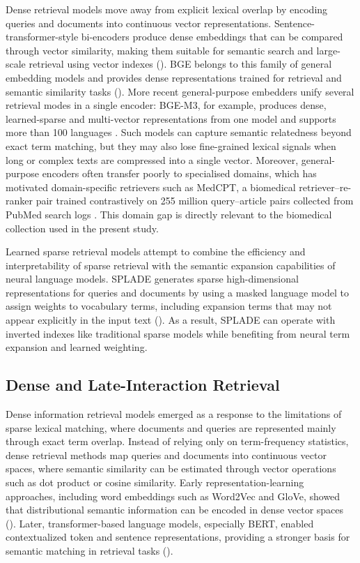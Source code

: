 \documentclass[preprint,5p,times,twocolumn,authoryear]{elsarticle}
\begin{document}
Dense retrieval models move away from explicit lexical overlap by encoding queries and documents into continuous vector representations. Sentence-transformer-style bi-encoders produce dense embeddings that can be compared through vector similarity, making them suitable for semantic search and large-scale retrieval using vector indexes (\cite{reimers2019sentencebert}). BGE belongs to this family of general embedding models and provides dense representations trained for retrieval and semantic similarity tasks (\cite{xiao2024cpack}). More recent general-purpose embedders unify several retrieval modes in a single encoder: BGE-M3, for example, produces dense, learned-sparse and multi-vector representations from one model and supports more than 100 languages \citep{chen2024m3}. Such models can capture semantic relatedness beyond exact term matching, but they may also lose fine-grained lexical signals when long or complex texts are compressed into a single vector. Moreover, general-purpose encoders often transfer poorly to specialised domains, which has motivated domain-specific retrievers such as MedCPT, a biomedical retriever--re-ranker pair trained contrastively on 255 million query--article pairs collected from PubMed search logs \citep{jin2023medcpt}. This domain gap is directly relevant to the biomedical collection used in the present study.

Learned sparse retrieval models attempt to combine the efficiency and interpretability of sparse retrieval with the semantic expansion capabilities of neural language models. SPLADE generates sparse high-dimensional representations for queries and documents by using a masked language model to assign weights to vocabulary terms, including expansion terms that may not appear explicitly in the input text (\cite{formal2021splade}). As a result, SPLADE can operate with inverted indexes like traditional sparse models while benefiting from neural term expansion and learned weighting.

\subsection{Dense and Late-Interaction Retrieval}
Dense information retrieval models emerged as a response to the limitations of sparse lexical matching, where documents and queries are represented mainly through exact term overlap. Instead of relying only on term-frequency statistics, dense retrieval methods map queries and documents into continuous vector spaces, where semantic similarity can be estimated through vector operations such as dot product or cosine similarity. Early representation-learning approaches, including word embeddings such as Word2Vec and GloVe, showed that distributional semantic information can be encoded in dense vector spaces (\cite{w2v,gloveeee}). Later, transformer-based language models, especially BERT, enabled contextualized token and sentence representations, providing a stronger basis for semantic matching in retrieval tasks (\cite{bert,pretrained}).
\end{document}
